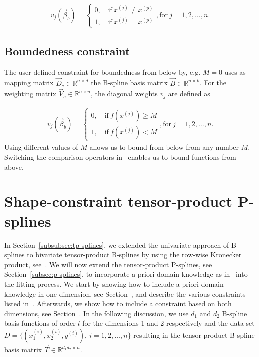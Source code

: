 \begin{align} \label{eq:v_jamming}
	v_j(\vec{\beta}_b) = 
	\begin{cases}
		0, \quad \text{if} \ x^{(j)} \ne x^{(p)} \\
		1, \quad \text{if} \ x^{(j)} = x^{(p)} 
	\end{cases}, \text{for} \ j = 1,2,\dots,n.
\end{align} 

\subsection{Boundedness constraint} \label{subsec:BoudC}

The user-defined constraint for boundedness from below by, e.g. $M=0$ uses as mapping matrix $\vec{D}_c \in \mathbb{R}^{n \times d}$ the B-spline basis matrix $\vec{B} \in \mathbb{R}^{n \times k}$. For the weighting matrix $\vec{V}_c \in \mathbb{R}^{n\times n}$, the diagonal weights $v_j$ are defined as

\begin{align} \label{eq:v_boundedness}
	v_j(\vec{\beta}_b) = \begin{cases} 
		0, \quad \text{if} \ f(x^{(j)}) \ge M\\ 
		1, \quad \text{if} \ f(x^{(j)})  < M 		
	\end{cases}, \text{for} \ j=1,2,\dots,n.
\end{align}
%
Using different values of $M$ allows us to bound from below from any number $M$. Switching the comparison operators in~ enables us to bound functions from above. 


\section{Shape-constraint tensor-product P-splines}\label{sec:SCP-tp-splines}

In  Section~\ref{subsubsec:tp-splines}, we extended the univariate approach of B-splines to bivariate tensor-product B-splines by using the row-wise Kronecker product, see~. We will now extend the tensor-product P-splines, see Section~\ref{subsec:p-splines}, to incorporate a priori domain knowledge as in~ into the fitting process. We start by showing how to include a priori domain knowledge in one dimension, see Section~, and describe the various constraints listed in~. Afterwards, we show how to include a constraint based on both dimensions, see Section~. In the following discussion, we use $d_1$ and $d_2$ B-spline basis functions of order $l$ for the dimensions 1 and 2 respectively and the data set $D = \{(x_1^{(i)}, x_2^{(i)}, y^{(i)}), \ i=1,2,\dots,n\}$ resulting in the tensor-product B-spline basis matrix $\vec{T} \in \mathbb{R}^{d_1d_2 \times n}$.

